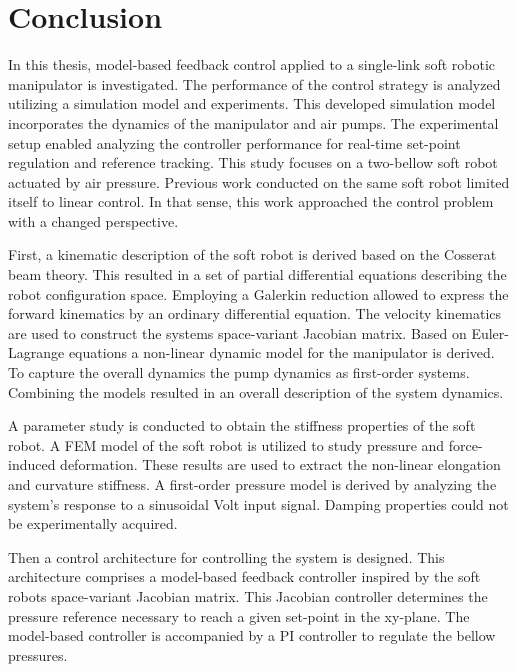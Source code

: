 \section{Conclusion}

In this thesis, model-based feedback control applied to a single-link soft robotic manipulator is investigated. The performance of the control strategy is analyzed utilizing a simulation model and experiments. This developed simulation model incorporates the dynamics of the manipulator and air pumps. The experimental setup enabled analyzing the controller performance for real-time set-point regulation and reference tracking. This study focuses on a two-bellow soft robot actuated by air pressure. Previous work \cite{berkers} conducted on the same soft robot limited itself to linear control. In that sense, this work approached the control problem with a changed perspective. 


First, a kinematic description of the soft robot is derived based on the Cosserat beam theory. This resulted in a set of partial differential equations describing the robot configuration space. Employing a Galerkin reduction allowed to express the forward kinematics by an ordinary differential equation. The velocity kinematics are used to construct the systems space-variant Jacobian matrix. Based on Euler-Lagrange equations a non-linear dynamic model for the manipulator is derived. To capture the overall dynamics the pump dynamics as first-order systems. Combining the models resulted in an overall description of the system dynamics. 

A parameter study is conducted to obtain the stiffness properties of the soft robot. A FEM model of the soft robot is utilized to study pressure and force-induced deformation. These results are used to extract the non-linear elongation and curvature stiffness. A first-order pressure model is derived by analyzing the system's response to a sinusoidal Volt input signal. Damping properties could not be experimentally acquired.

Then a control architecture for controlling the system is designed. This architecture comprises a model-based feedback controller inspired by the soft robots space-variant Jacobian matrix. This Jacobian controller determines the pressure reference necessary to reach a given set-point in the xy-plane. The model-based controller is accompanied by a PI controller to regulate the bellow pressures. 

